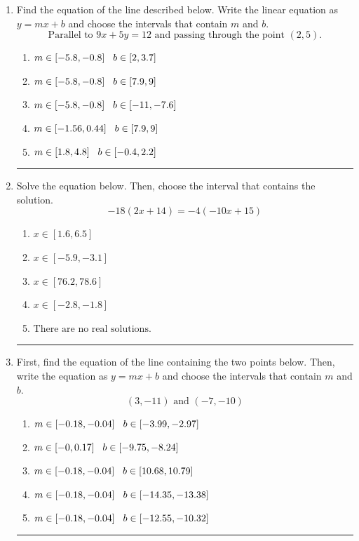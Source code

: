 \documentclass[14pt]{extbook}
\newcommand{\litem}[1]{\item#1\hspace*{-1cm}\rule{\textwidth}{0.4pt}}
\begin{document}
\begin{enumerate}
{\begin{enumerate}[label=\Alph*.]
\end{enumerate} }
\litem{
Find the equation of the line described below. Write the linear equation as $ y=mx+b $ and choose the intervals that contain $m$ and $b$.\[ \text{Parallel to } 9 x + 5 y = 12 \text{ and passing through the point } (2, 5). \]\begin{enumerate}[label=\Alph*.]
\item \( m \in [-5.8, -0.8] \hspace*{3mm} b \in [2, 3.7] \)
\item \( m \in [-5.8, -0.8] \hspace*{3mm} b \in [7.9, 9] \)
\item \( m \in [-5.8, -0.8] \hspace*{3mm} b \in [-11, -7.6] \)
\item \( m \in [-1.56, 0.44] \hspace*{3mm} b \in [7.9, 9] \)
\item \( m \in [1.8, 4.8] \hspace*{3mm} b \in [-0.4, 2.2] \)

\end{enumerate} }
\litem{
Solve the equation below. Then, choose the interval that contains the solution.\[ -18(2x + 14) = -4(-10x + 15) \]\begin{enumerate}[label=\Alph*.]
\item \( x \in [1.6, 6.5] \)
\item \( x \in [-5.9, -3.1] \)
\item \( x \in [76.2, 78.6] \)
\item \( x \in [-2.8, -1.8] \)
\item \( \text{There are no real solutions.} \)

\end{enumerate} }
\litem{
First, find the equation of the line containing the two points below. Then, write the equation as $ y=mx+b $ and choose the intervals that contain $m$ and $b$.\[ (3, -11) \text{ and } (-7, -10) \]\begin{enumerate}[label=\Alph*.]
\item \( m \in [-0.18, -0.04] \hspace*{3mm} b \in [-3.99, -2.97] \)
\item \( m \in [-0, 0.17] \hspace*{3mm} b \in [-9.75, -8.24] \)
\item \( m \in [-0.18, -0.04] \hspace*{3mm} b \in [10.68, 10.79] \)
\item \( m \in [-0.18, -0.04] \hspace*{3mm} b \in [-14.35, -13.38] \)
\item \( m \in [-0.18, -0.04] \hspace*{3mm} b \in [-12.55, -10.32] \)


\end{enumerate}}
\end{enumerate}
\end{document}
